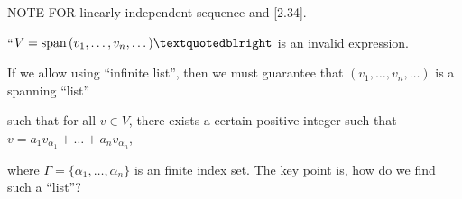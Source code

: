 \documentclass[a4paper, 11pt, UTF8]{article}
\def\Spn{\textup{span}\,}
\begin{document}
\begin{large}
{\timesbf\Large N{\normalsize OTE} F{\normalsize OR} \timessl linearly independent sequence and [2.34].}\par\quad
“$V=\Spn(v_1,\dots,v_n,\dots)”$ is an invalid expression.\par\qquad
If we allow using “infinite list”, then we must guarantee that $(v_1,\dots,v_n,\dots)$ is a spanning “list”\par\qquad
such that for all $v\in V$, there exists a certain positive integer such that $v=a_1 v_{\alpha_1}+\dots+a_n v_{\alpha_n}$,\par\qquad
where $\Gamma=\{\alpha_1,\dots,\alpha_n\}$ is an finite index set. The key point is, how do we find such a “list”?\par


\end{large}
\end{document}
